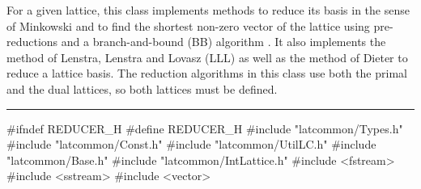 % 
% 
% 
% 


For a given lattice, this class implements methods to reduce its basis in the
sense of Minkowski and to find the shortest non-zero vector of the lattice
using pre-reductions and a branch-and-bound (BB) algorithm \cite{rLEC97c}.
It also implements the method of  Lenstra, Lenstra and Lovasz (LLL) \cite{mLEN82a}
as well as  the method of Dieter \cite{rDIE75a} to reduce a lattice basis.
The reduction algorithms in this class use both the primal and the dual lattices,
so both lattices must be defined.

\bigskip\hrule
\code\hide
#ifndef REDUCER_H
#define REDUCER_H
\endhide 
#include "latcommon/Types.h"
#include "latcommon/Const.h"
#include "latcommon/UtilLC.h"
#include "latcommon/Base.h"
#include "latcommon/IntLattice.h"
#include <fstream>
#include <sstream>
#include <vector>


